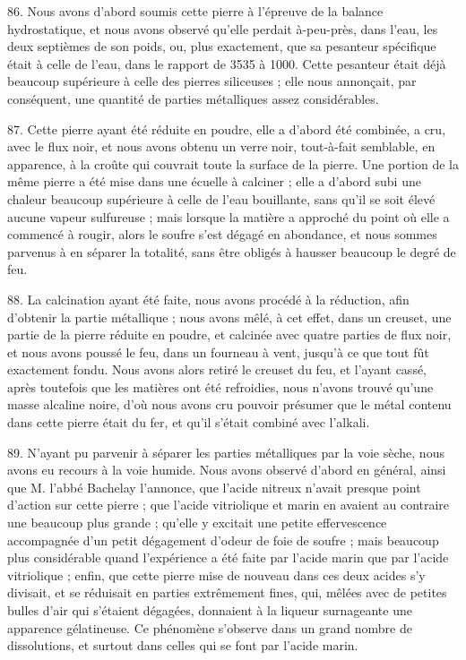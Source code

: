 \documentclass[a4paper, 11pt, oneside, polutonikogreek, french]{article}
\begin{document}
86. Nous avons d'abord soumis cette pierre à l'épreuve de la balance hydrostatique, et nous avons observé qu'elle perdait à-peu-près, dans l'eau, les deux septièmes de son poids, ou, plus exactement, que sa pesanteur spécifique était à celle de l'eau, dans le rapport de 3535 à 1000. Cette pesanteur était déjà beaucoup supérieure à celle des pierres siliceuses ; elle nous annonçait, par conséquent, une quantité de parties métalliques assez considérables.

87. Cette pierre ayant été réduite en poudre, elle a d'abord été combinée, a cru, avec le flux noir, et nous avons obtenu un verre noir, tout-à-fait semblable, en apparence, à la croûte qui couvrait toute la surface de la pierre. Une portion de la même pierre a été mise dans une écuelle à calciner ; elle a d'abord subi une chaleur beaucoup supérieure à celle de l'eau bouillante, sans qu'il se soit élevé aucune vapeur sulfureuse ; mais lorsque la matière a approché du point où elle a commencé à rougir, alors le soufre s'est dégagé en abondance, et nous sommes parvenus à en séparer la totalité, sans être obligés à hausser beaucoup le degré de feu.

88. La calcination ayant été faite, nous avons procédé à la réduction, afin d'obtenir la partie métallique ; nous avons mêlé, à cet effet, dans un creuset, une partie de la pierre réduite en poudre, et calcinée avec quatre parties de flux noir, et nous avons poussé le feu, dans un fourneau à vent, jusqu'à ce que tout fût exactement fondu. Nous avons alors retiré le creuset du feu, et l'ayant cassé, après toutefois que les matières ont été refroidies, nous n'avons trouvé qu'une masse alcaline noire, d'où nous avons cru pouvoir présumer que le métal contenu dans cette pierre était du fer, et qu'il s'était combiné avec l'alkali.

89. N'ayant pu parvenir à séparer les parties métalliques par la voie sèche, nous avons eu recours à la voie humide. Nous avons observé d'abord en général, ainsi que M. l'abbé Bachelay l'annonce, que l'acide nitreux n'avait presque point d'action sur cette pierre ; que l'acide vitriolique et marin en avaient au contraire une beaucoup plus grande ; qu'elle y excitait une petite effervescence accompagnée d'un petit dégagement d'odeur de foie de soufre ; mais beaucoup plus considérable quand l'expérience a été faite par l'acide marin que par l'acide vitriolique ; enfin, que cette pierre mise de nouveau dans ces deux acides s'y divisait, et se réduisait en parties extrêmement fines, qui, mêlées avec de petites bulles d'air qui s'étaient dégagées, donnaient à la liqueur surnageante une apparence gélatineuse. Ce phénomène s'observe dans un grand nombre de dissolutions, et surtout dans celles qui se font par l'acide marin.
\end{document}
